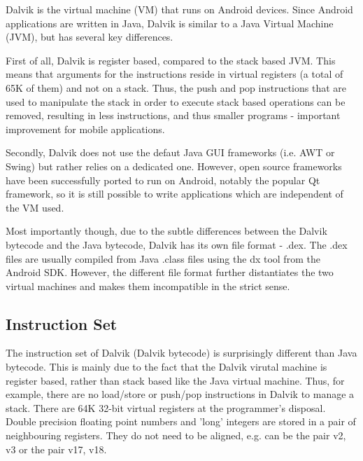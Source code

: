 \documentclass[parskip]{cs4rep}
\begin{document}
Dalvik is the virtual machine (VM) that runs on Android devices. Since Android applications are written in Java, Dalvik is similar to a Java Virtual Machine (JVM), but has several key differences.

First of all, Dalvik is register based, compared to the stack based JVM. This means that arguments for the instructions reside in virtual registers (a total of 65K of them) and not on a stack. Thus, the push and pop instructions that are used to manipulate the stack in order to execute stack based operations can be removed, resulting in less instructions, and thus smaller programs - important improvement for mobile applications.

Secondly, Dalvik does not use the defaut Java GUI frameworks (i.e. AWT or Swing) but rather relies on a dedicated one. However, open source frameworks have been successfully ported to run on Android, notably the popular Qt framework, so it is still possible to write applications which are independent of the VM  used.

Most importantly though, due to the subtle differences between the Dalvik bytecode and the Java bytecode, Dalvik has its own file format - .dex. The .dex files are usually compiled from Java .class files using the dx tool from the Android SDK. However, the different file format further distantiates the two virtual machines and makes them incompatible in the strict sense.

\subsection{Instruction Set} \label{sec:DalvikInstructionSet}

The instruction set of Dalvik (Dalvik bytecode) is surprisingly different than Java bytecode. This is mainly due to the fact that the Dalvik virutal machine is register based, rather than stack based like the Java virtual machine. Thus, for example, there are no load/store or push/pop instructions in Dalvik to manage a stack. There are 64K 32-bit virtual registers at the programmer's disposal. Double precision floating point numbers and 'long' integers are stored in a pair of neighbouring registers. They do not need to be aligned, e.g. can be the pair {v2, v3} or the pair {v17, v18}.
\end{document}
